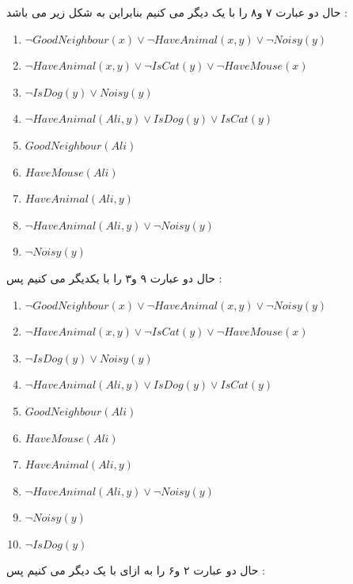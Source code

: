 \documentclass{article}
\begin{document}
حال دو عبارت ۷ و۸ را با یک دیگر 
می کنیم بنابراین 
به شکل زیر می باشد  : 
\begin{center}
	\begin{enumerate}
		\item $ \neg GoodNeighbour(x) \lor\neg HaveAnimal(x,y)  \lor \neg Noisy(y)$
		\item $ \neg HaveAnimal(x,y) \lor \neg IsCat(y)\lor \neg HaveMouse(x)$
		\item $ \neg IsDog(y) \lor Noisy(y)$
		\item $ \neg HaveAnimal(Ali,y) \lor IsDog(y) \lor IsCat(y)$
		\item $ GoodNeighbour(Ali)$
		\item $HaveMouse(Ali)$
		\item $HaveAnimal(Ali,y)$
		\item $\neg HaveAnimal(Ali,y) \lor \neg Noisy(y)$
		\item $ \neg Noisy(y)$
	\end{enumerate}
\end{center}
حال دو عبارت ۹ و۳ را با یکدیگر 
می کنیم پس  :
\begin{center}
	\begin{enumerate}
		\item $ \neg GoodNeighbour(x) \lor\neg HaveAnimal(x,y)  \lor \neg Noisy(y)$
		\item $ \neg HaveAnimal(x,y) \lor \neg IsCat(y)\lor \neg HaveMouse(x)$
		\item $ \neg IsDog(y) \lor Noisy(y)$
		\item $ \neg HaveAnimal(Ali,y) \lor IsDog(y) \lor IsCat(y)$
		\item $ GoodNeighbour(Ali)$
		\item $HaveMouse(Ali)$
		\item $HaveAnimal(Ali,y)$
		\item $\neg HaveAnimal(Ali,y) \lor \neg Noisy(y)$
		\item $ \neg Noisy(y)$
		\item $\neg IsDog(y)$
	\end{enumerate}
\end{center}
حال دو عبارت ۲ و۶ را به ازای 
با یک دیگر 
می کنیم پس  : 
\end{document}
